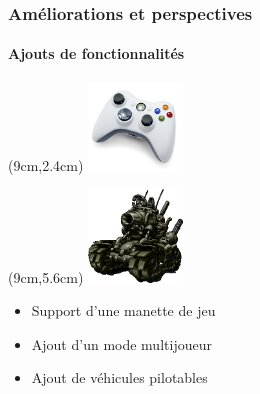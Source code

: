 \begin{frame}

\frametitle{Améliorations et perspectives}
	\framesubtitle{Ajouts de fonctionnalités}


	\begin{textblock*}{2.5cm}(9cm,2.4cm)
		\includegraphics[width=2.5cm]{figures/pad_xbox.png}
	\end{textblock*}

	\begin{textblock*}{2.5cm}(9cm,5.6cm)
		\includegraphics[width=2.5cm]{figures/vehicle.png}
	\end{textblock*}


	\begin{itemize}
		\item Support d'une manette de jeu
	\end{itemize}

	\begin{itemize}
		\item Ajout d'un mode multijoueur
	\end{itemize}

	\begin{itemize}
		\item Ajout de véhicules pilotables
	\end{itemize}
	

\end{frame}
